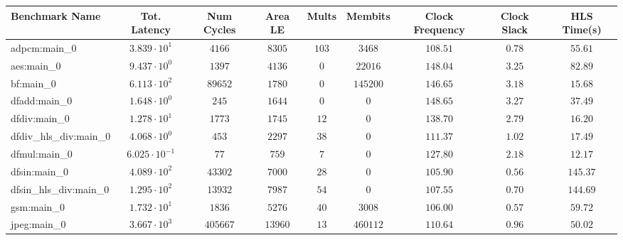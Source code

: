 \begin{tabular}{|l|c|c|c|c|c|c|c|c|}
\hline
Benchmark Name          & Tot. Latency            & Num Cycles & Area LE   & Mults   & Membits    & Clock Frequency & Clock Slack & HLS Time(s) \\
\hline
adpcm:main\_0           & $ 3.839 \cdot 10^{1}  $ & $ 4166   $ & $ 8305  $ & $ 103 $ & $ 3468   $ & $ 108.51      $ & $ 0.78    $ & $ 55.61   $ \\
aes:main\_0             & $ 9.437 \cdot 10^{0}  $ & $ 1397   $ & $ 4136  $ & $ 0   $ & $ 22016  $ & $ 148.04      $ & $ 3.25    $ & $ 82.89   $ \\
bf:main\_0              & $ 6.113 \cdot 10^{2}  $ & $ 89652  $ & $ 1780  $ & $ 0   $ & $ 145200 $ & $ 146.65      $ & $ 3.18    $ & $ 15.68   $ \\
dfadd:main\_0           & $ 1.648 \cdot 10^{0}  $ & $ 245    $ & $ 1644  $ & $ 0   $ & $ 0      $ & $ 148.65      $ & $ 3.27    $ & $ 37.49   $ \\
dfdiv:main\_0           & $ 1.278 \cdot 10^{1}  $ & $ 1773   $ & $ 1745  $ & $ 12  $ & $ 0      $ & $ 138.70      $ & $ 2.79    $ & $ 16.20   $ \\
dfdiv\_hls\_div:main\_0 & $ 4.068 \cdot 10^{0}  $ & $ 453    $ & $ 2297  $ & $ 38  $ & $ 0      $ & $ 111.37      $ & $ 1.02    $ & $ 17.49   $ \\
dfmul:main\_0           & $ 6.025 \cdot 10^{-1} $ & $ 77     $ & $ 759   $ & $ 7   $ & $ 0      $ & $ 127.80      $ & $ 2.18    $ & $ 12.17   $ \\
dfsin:main\_0           & $ 4.089 \cdot 10^{2}  $ & $ 43302  $ & $ 7000  $ & $ 28  $ & $ 0      $ & $ 105.90      $ & $ 0.56    $ & $ 145.37  $ \\
dfsin\_hls\_div:main\_0 & $ 1.295 \cdot 10^{2}  $ & $ 13932  $ & $ 7987  $ & $ 54  $ & $ 0      $ & $ 107.55      $ & $ 0.70    $ & $ 144.69  $ \\
gsm:main\_0             & $ 1.732 \cdot 10^{1}  $ & $ 1836   $ & $ 5276  $ & $ 40  $ & $ 3008   $ & $ 106.00      $ & $ 0.57    $ & $ 59.72   $ \\
jpeg:main\_0            & $ 3.667 \cdot 10^{3}  $ & $ 405667 $ & $ 13960 $ & $ 13  $ & $ 460112 $ & $ 110.64      $ & $ 0.96    $ & $ 50.02   $ \\

\end{tabular}
